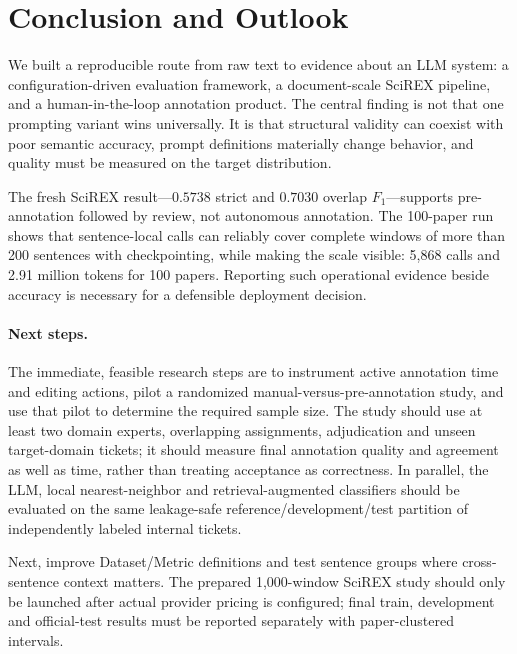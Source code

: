\section{Conclusion and Outlook}
\label{sec:conclusion}

We built a reproducible route from raw text to evidence about an LLM system: a
configuration-driven evaluation framework, a document-scale SciREX pipeline, and
a human-in-the-loop annotation product. The central finding is not that one
prompting variant wins universally. It is that structural validity can coexist
with poor semantic accuracy, prompt definitions materially change behavior, and
quality must be measured on the target distribution.

The fresh SciREX result---$0.5738$ strict and $0.7030$ overlap $F_1$---supports
pre-annotation followed by review, not autonomous annotation. The 100-paper run
shows that sentence-local calls can reliably cover complete windows of more than
200 sentences with checkpointing, while making the scale visible: 5{,}868 calls and
2.91 million tokens for 100 papers. Reporting such operational evidence beside
accuracy is necessary for a defensible deployment decision.

\paragraph{Next steps.}
The immediate, feasible research steps are to instrument active annotation time
and editing actions, pilot a randomized manual-versus-pre-annotation study, and
use that pilot to determine the required sample size. The study should use at
least two domain experts, overlapping assignments, adjudication and unseen
target-domain tickets; it should measure final annotation quality and agreement
as well as time, rather than treating acceptance as correctness. In parallel,
the LLM, local nearest-neighbor and retrieval-augmented classifiers should be
evaluated on the same leakage-safe reference/development/test partition of
independently labeled internal tickets.

Next, improve Dataset/Metric definitions and test sentence groups where
cross-sentence context matters. The prepared 1{,}000-window SciREX study should
only be launched after actual provider pricing is configured; final train,
development and official-test results must be reported separately with
paper-clustered intervals.

